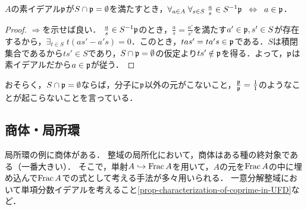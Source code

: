 \documentclass[uplatex,dvipdfmx]{jsreport}
\begin{document}
\begin{lemma}
    $A$の素イデアル$\mathfrak{p}$が$S\cap\mathfrak{p}=\emptyset$を満たすとき，$\forall_{a\in A}\;\forall_{s\in S}\;\frac{a}{s}\in S^{-1}\mathfrak{p}\;\;\Leftrightarrow\;\; a\in\mathfrak{p}$．
\end{lemma}
\begin{proof}
    $\Rightarrow$を示せば良い．
    $\frac{a}{s}\in S^{-1}\mathfrak{p}$のとき，$\frac{a}{s}=\frac{a'}{s'}$を満たす$a'\in\mathfrak{p},s'\in S$が存在するから，$\exists_{t\in S}\;t(as'-a's)=0$．このとき，$tas'=ta's\in\mathfrak{p}$である．$S$は積閉集合であるから$ts'\in S$であり，$S\cap\mathfrak{p}=\emptyset$の仮定より$ts'\notin\mathfrak{p}$を得る．よって，$\mathfrak{p}$は素イデアルだから$a\in\mathfrak{p}$が従う．
\end{proof}
\begin{remarks}
    おそらく，$S\cap\mathfrak{p}=\emptyset$ならば，分子に$\mathfrak{p}$以外の元がこないこと，$\frac{\mathfrak{p}}{\mathfrak{p}}=\frac{1}{1}$のようなことが起こらないことを言っている．
\end{remarks}

\subsection{商体・局所環}

\begin{tcolorbox}[colframe=ForestGreen, colback=ForestGreen!10!white,breakable,colbacktitle=ForestGreen!40!white,coltitle=black,fonttitle=\bfseries\sffamily,
title=]
    局所環の例に商体がある．
    整域の局所化において，商体はある種の終対象である（一番大きい）．
    そこで，単射$A\hookrightarrow\mathrm{Frac}\, A$を用いて，$A$の元を$\mathrm{Frac}\, A$の中に埋め込んで$\mathrm{Frac}\, A$での式として考える手法が多々用いられる．
    一意分解整域において単項分数イデアルを考えること\ref{prop-characterization-of-coprime-in-UFD}など．
\end{tcolorbox}
\end{document}
